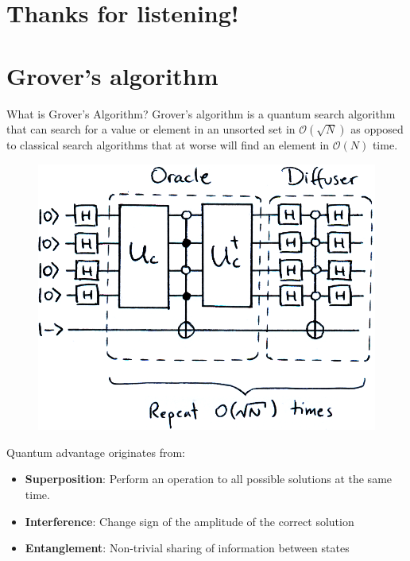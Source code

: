 \documentclass[11p,aspectratio=169]{beamer}
\begin{document}
\section{Thanks for listening!}

\section{Grover's algorithm}

\begin{frame}{What is Grover’s Algorithm?}
    Grover’s algorithm is a quantum search algorithm that can search for a value or element in an
    unsorted set in $\mathcal{O}(\sqrt{N})$ as opposed to classical search algorithms that at worse will find an
    element in $\mathcal{O}(N)$ time. 

    \begin{figure}
        \includegraphics[height= 0.4 \textheight]{figures/grover.png}
    \end{figure}

    Quantum advantage originates from:
    \begin{itemize}
        \item \textbf{Superposition}: Perform an operation to all
        possible solutions at the same time.
        \item \textbf{Interference}: Change sign of the amplitude of the correct solution
        \item \textbf{Entanglement}: Non-trivial sharing of information between states
    \end{itemize}
\end{frame}
\end{document}
